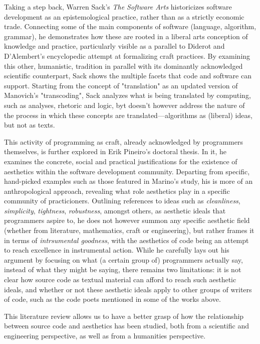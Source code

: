 Taking a step back, Warren Sack's \emph{The Software Arts}\cite{sack_software_2019} historicizes software development as an epistemological practice, rather than as a strictly economic trade. Connecting some of the main components of software (language, algorithm, grammar), he demonstrates how these are rooted in a liberal arts conception of knowledge and practice, particularly visible as a parallel to Diderot and D'Alembert's encyclopedic attempt at formalizing craft practices. By examining this other, humanistic, tradition in parallel with its dominantly acknowledged scientific counterpart, Sack shows the multiple facets that code and software can support. Starting from the concept of "translation" as an updated version of Manovich's "transcoding", Sack analyzes what is being translated by computing, such as analyses, rhetoric and logic, byt doesn't however address the nature of the process in which these concepts are translated—algorithms as (liberal) ideas, but not as texts.

This activity of programming as craft, already acknowledged by programmers themselves, is further explored in Erik Pineiro's doctoral thesis\cite{pineiro_aesthetics_2003}. In it, he examines the concrete, social and practical justifications for the existence of aesthetics within the software development community. Departing from specific, hand-picked examples such as those featured in Marino's study, his is more of an anthropological approach, revealing what role aesthetics play in a specific community of practicioners. Outlining references to ideas such as \emph{cleanliness}, \emph{simplicity}, \emph{tightness}, \emph{robustness}, amongst others, as aesthetic ideals that programmers aspire to, he does not however summon any specific aesthetic field (whether from literature, mathematics, craft or engineering), but rather frames it in terms of \emph{intrsumental goodness}, with the aesthetics of code being an attempt to reach excellence in instrumental action. While he carefully lays out his argument by focusing on what (a certain group of) programmers actually say, instead of what they might be saying, there remains two limitations: it is not clear how source code as textual material can afford to reach such aesthetic ideals, and whether or not these aesthetic ideals apply to other groups of writers of code, such as the code poets mentioned in some of the works above.

\vspace*{1\baselineskip}

This literature review allows us to have a better grasp of how the relationship between source code and aesthetics has been studied, both from a scientific and engineering perspective, as well as from a humanities perspective.

